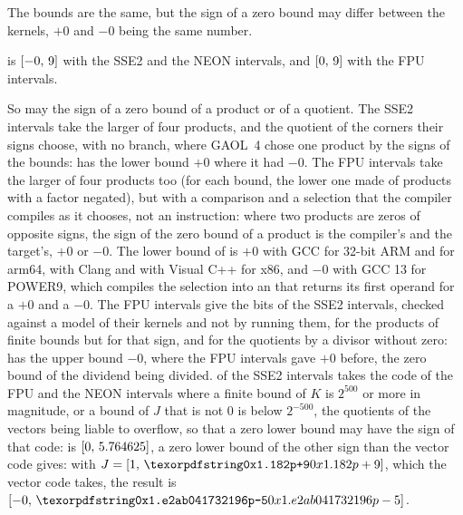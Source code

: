 \medskip
The bounds are the same, but the sign of a zero bound may differ between
the kernels, $+0$ and $-0$ being the same number.

\begin{Ex}
 is $[-0,\,9]$ with the SSE2 and the
NEON intervals, and $[0,\,9]$ with the FPU intervals.
\end{Ex}

So may the sign of a zero bound of a product or of a quotient. The SSE2
intervals take the larger of four products, and the quotient of the
corners their signs choose, with no branch, where GAOL~4 chose one product
by the signs of the bounds: \code{[-1, 0] * [-1, 0]} has the lower bound
$+0$ where it had $-0$.\newinvfive{} The FPU intervals take the larger of
four products too (for each bound, the lower one made of products with a
factor negated),\newinvfive{} but with a comparison and a selection that
the compiler compiles as it chooses, not an instruction: where two
products are zeros of opposite signs, the sign of the zero bound of a
product is the compiler's and the target's, $+0$ or $-0$. The lower bound
of \code{[-1, 0] * [-1, 0]} is $+0$ with GCC for 32-bit ARM and for arm64,
with Clang and with Visual C++ for x86, and $-0$ with GCC 13 for POWER9,
which compiles the selection into an  that returns its
first operand for a $+0$ and a $-0$. The FPU intervals give the bits of
the SSE2 intervals, checked against a model of their kernels and not by
running them, for the products of finite bounds but for that sign, and for
the quotients by a divisor without zero: \code{[0, 1] / [-2, -1]} has the
upper bound $-0$, where the FPU intervals gave $+0$ before, the zero bound
of the dividend being divided.  of the SSE2
intervals takes the code of the FPU and the NEON intervals where a finite bound of
$K$ is $2^{500}$ or more in magnitude, or a bound of $J$ that is not $0$
is below $2^{-500}$, the quotients of the vectors being liable to
overflow,\newinvfive{} so that a zero lower bound may have the sign of
that code: 
is $[0,\,5.764625]$, a zero lower bound of the other sign than the vector code gives: with $J=\itv{1}{\code{0x1.182p+9}}$, which the vector code takes, the result is $\itv{-0}{\code{0x1.e2ab041732196p-5}}$.

